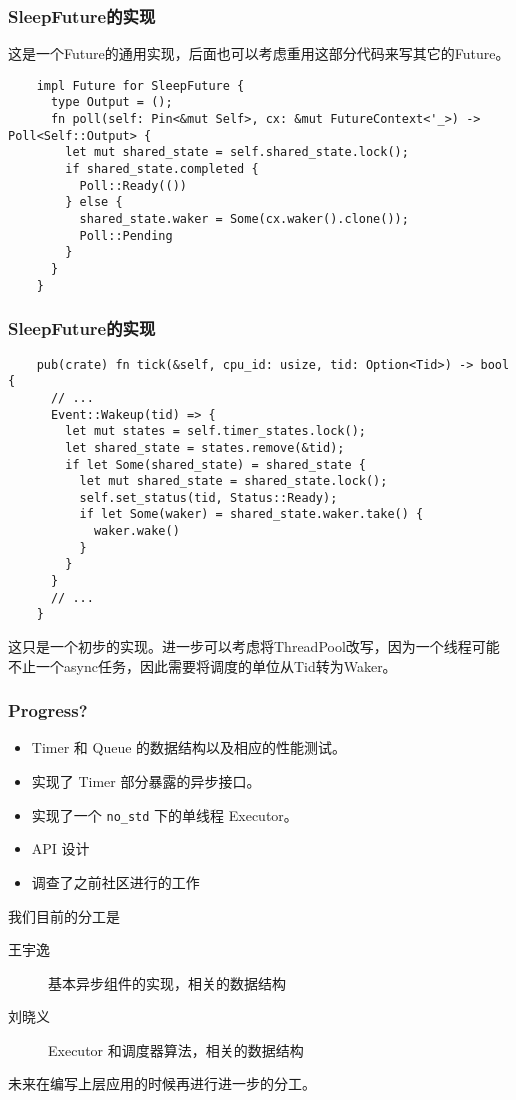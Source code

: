 \documentclass[UTF-8]{ctexbeamer}
\begin{document}
\begin{frame}[fragile]
  \frametitle{SleepFuture的实现}

  这是一个Future的通用实现，后面也可以考虑重用这部分代码来写其它的Future。
  {
  \scriptsize
  \begin{verbatim}
    impl Future for SleepFuture {
      type Output = ();
      fn poll(self: Pin<&mut Self>, cx: &mut FutureContext<'_>) -> Poll<Self::Output> {
        let mut shared_state = self.shared_state.lock();
        if shared_state.completed {
          Poll::Ready(())
        } else {
          shared_state.waker = Some(cx.waker().clone());
          Poll::Pending
        }
      }
    }    
  \end{verbatim}
  }
\end{frame}

\begin{frame}[fragile]
  \frametitle{SleepFuture的实现}

  {
    \scriptsize
    \begin{verbatim}
    pub(crate) fn tick(&self, cpu_id: usize, tid: Option<Tid>) -> bool {
      // ...
      Event::Wakeup(tid) => {
        let mut states = self.timer_states.lock();
        let shared_state = states.remove(&tid);
        if let Some(shared_state) = shared_state {
          let mut shared_state = shared_state.lock();
          self.set_status(tid, Status::Ready);
          if let Some(waker) = shared_state.waker.take() {
            waker.wake()
          }
        }
      }
      // ...
    }
  \end{verbatim}
  }

  这只是一个初步的实现。进一步可以考虑将ThreadPool改写，因为一个线程可能不止一个async任务，因此需要将调度的单位从Tid转为Waker。
\end{frame}

\begin{frame}
  \frametitle{Progress?}
  \begin{itemize}
    \item Timer 和 Queue 的数据结构以及相应的性能测试。
    \item 实现了 Timer 部分暴露的异步接口。
    \item 实现了一个 \texttt{no\_std} 下的单线程 Executor。
    \item API 设计
    \item 调查了之前社区进行的工作
  \end{itemize}

  \pause
  \vspace{2em}

  我们目前的分工是
  \begin{description}
    \item[王宇逸] 基本异步组件的实现，相关的数据结构
    \item[刘晓义] Executor 和调度器算法，相关的数据结构
  \end{description}

  未来在编写上层应用的时候再进行进一步的分工。
\end{frame}
\end{document}
